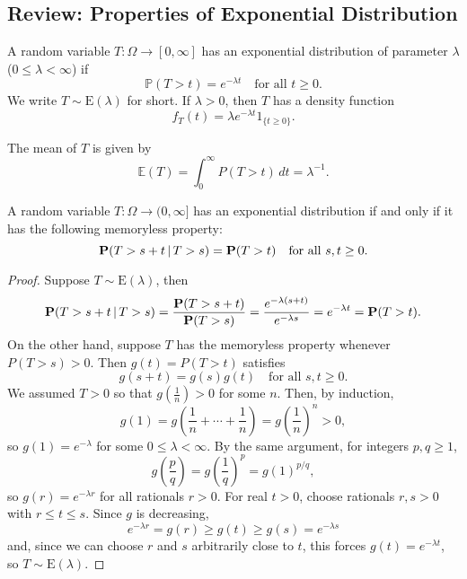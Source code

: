 \subsection{Review: Properties of Exponential Distribution}
\begin{definition}
    A random variable \(T : \Omega \to [0,\infty]\) has an exponential distribution of parameter \(\lambda\) (\(0 \leq \lambda < \infty\)) if
\[
\mathbb{P}(T > t) = e^{-\lambda t} \quad \text{for all } t \geq 0.
\]
We write \(T \sim \text{E}(\lambda)\) for short. If \(\lambda > 0\), then \(T\) has a density function
\[
f_T(t) = \lambda e^{-\lambda t} 1_{\{t \geq 0\}}.
\]
\end{definition}
\begin{remark}
    The mean of \(T\) is given by
\[
\mathbb{E}(T) = \int_{0}^{\infty} P(T > t) \, dt = \lambda^{-1}.
\]

\end{remark}

\begin{theorem}
    A random variable \(T : \Omega \to (0,\infty]\) has an exponential distribution if and only if it has the following memoryless property:
\[
\mathbf{P}(T > s + t \,|\, T > s) = \mathbf{P}(T > t) \quad \text{for all } s, t \geq 0.
\]
\end{theorem}
\begin{proof}
    Suppose \(T \sim \text{E}(\lambda)\), then
\[
\mathbf{P}(T > s + t \,|\, T > s) = \frac{\mathbf{P}(T > s + t)}{ \mathbf{P}(T > s)} = \frac{e^{-\lambda(s+t)}}{e^{-\lambda s}} = e^{-\lambda t} = \mathbf{P}(T > t).
\]
On the other hand, suppose \(T\) has the memoryless property whenever \(P(T > s) > 0\). Then \(g(t) = P(T > t)\) satisfies
\[
g(s + t) = g(s)g(t) \quad \text{for all } s, t \geq 0.
\]
We assumed \(T > 0\) so that \(g\left(\frac{1}{n}\right) > 0\) for some \(n\). Then, by induction,
\[
g(1) = g(\frac{1}{n}+\cdots+\frac{1}{n})=g\left(\frac{1}{n}\right)^n > 0,
\]
so \(g(1) = e^{-\lambda}\) for some \(0 \leq \lambda < \infty\). By the same argument, for integers \(p, q \geq 1\),
\[
g\left(\frac{p}{q}\right) = g\left(\frac{1}{q}\right)^p = g(1)^{p/q},
\]
so \(g(r) = e^{-\lambda r}\) for all rationals \(r > 0\). For real \(t > 0\), choose rationals \(r, s > 0\) with \(r \leq t \leq s\). Since \(g\) is decreasing,
\[
e^{-\lambda r} = g(r) \geq g(t) \geq g(s) = e^{-\lambda s}
\]
and, since we can choose \(r\) and \(s\) arbitrarily close to \(t\), this forces \(g(t) = e^{-\lambda t}\), so \(T \sim \text{E}(\lambda)\).

\end{proof}

